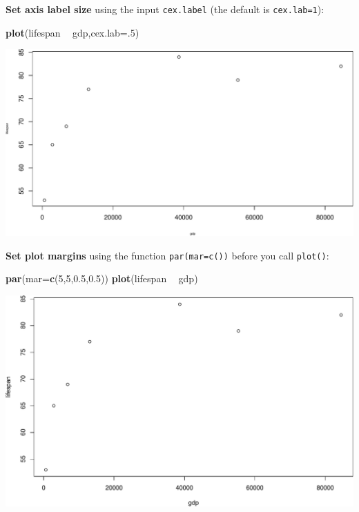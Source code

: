 \documentclass[
]{book}
\newenvironment{Shaded}{\begin{snugshade}}{\end{snugshade}}
\newcommand{\DataTypeTok}[1]{\textcolor[rgb]{0.13,0.29,0.53}{#1}}
\newcommand{\DecValTok}[1]{\textcolor[rgb]{0.00,0.00,0.81}{#1}}
\newcommand{\FloatTok}[1]{\textcolor[rgb]{0.00,0.00,0.81}{#1}}
\newcommand{\KeywordTok}[1]{\textcolor[rgb]{0.13,0.29,0.53}{\textbf{#1}}}
\newcommand{\NormalTok}[1]{#1}
\newcommand{\OperatorTok}[1]{\textcolor[rgb]{0.81,0.36,0.00}{\textbf{#1}}}
\newcommand{\StringTok}[1]{\textcolor[rgb]{0.31,0.60,0.02}{#1}}
\begin{document}
\textbf{Set axis label size} using the input \texttt{cex.label} (the default is \texttt{cex.lab=1}):

\begin{Shaded}
\begin{Highlighting}[]
\KeywordTok{plot}\NormalTok{(lifespan }\OperatorTok{~}\StringTok{ }\NormalTok{gdp,}\DataTypeTok{cex.lab=}\NormalTok{.}\DecValTok{5}\NormalTok{)}
\end{Highlighting}
\end{Shaded}

\includegraphics{figures/unnamed-chunk-109-1.pdf}

\textbf{Set plot margins} using the function \texttt{par(mar=c())} before you call \texttt{plot()}:

\begin{Shaded}
\begin{Highlighting}[]
\KeywordTok{par}\NormalTok{(}\DataTypeTok{mar=}\KeywordTok{c}\NormalTok{(}\DecValTok{5}\NormalTok{,}\DecValTok{5}\NormalTok{,}\FloatTok{0.5}\NormalTok{,}\FloatTok{0.5}\NormalTok{))}
\KeywordTok{plot}\NormalTok{(lifespan }\OperatorTok{~}\StringTok{ }\NormalTok{gdp)}
\end{Highlighting}
\end{Shaded}

\includegraphics{figures/unnamed-chunk-110-1.pdf}
\end{document}
